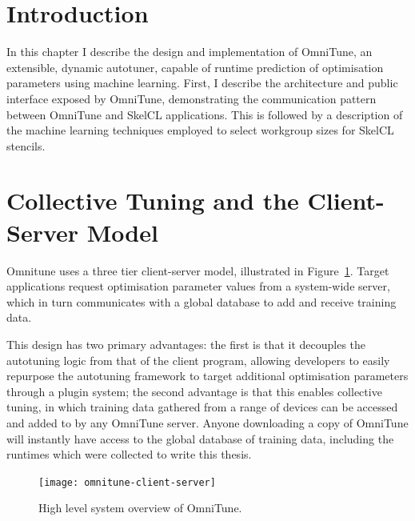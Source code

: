 \section{Introduction}

In this chapter I describe the design and implementation of OmniTune,
an extensible, dynamic autotuner, capable of runtime prediction of
optimisation parameters using machine learning. First, I describe the
architecture and public interface exposed by OmniTune, demonstrating
the communication pattern between OmniTune and SkelCL
applications. This is followed by a description of the machine
learning techniques employed to select workgroup sizes for SkelCL
stencils.



%

\section{Collective Tuning and the Client-Server Model}

Omnitune uses a three tier client-server model, illustrated in
Figure~\ref{fig:omnitune-client-server}. Target applications request
optimisation parameter values from a system-wide server, which in turn
communicates with a global database to add and receive training data.

This design has two primary advantages: the first is that it decouples
the autotuning logic from that of the client program, allowing
developers to easily repurpose the autotuning framework to target
additional optimisation parameters through a plugin system; the second
advantage is that this enables collective tuning, in which training
data gathered from a range of devices can be accessed and added to by
any OmniTune server. Anyone downloading a copy of OmniTune will
instantly have access to the global database of training data,
including the  runtimes which were collected to
write this thesis.


\begin{figure}
\centering
\texttt{[image: omnitune-client-server]}
\caption{%
  High level system overview of OmniTune.%
}
\label{fig:omnitune-client-server}
\end{figure}

